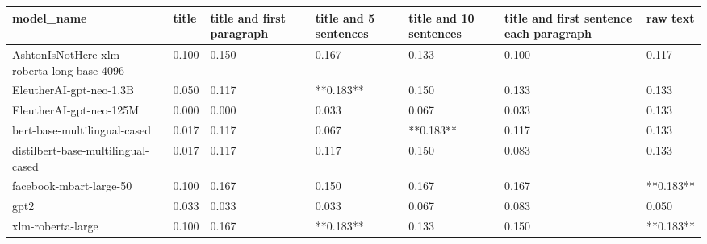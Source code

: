\begin{tabular}{lllllll}
\toprule
                                model\_name & title & title and first paragraph & title and 5 sentences & title and 10 sentences & title and first sentence each paragraph &  raw text \\
\midrule
AshtonIsNotHere-xlm-roberta-long-base-4096 & 0.100 &                     0.150 &                 0.167 &                  0.133 &                                   0.100 &     0.117 \\
                   EleutherAI-gpt-neo-1.3B & 0.050 &                     0.117 &             **0.183** &                  0.150 &                                   0.133 &     0.133 \\
                   EleutherAI-gpt-neo-125M & 0.000 &                     0.000 &                 0.033 &                  0.067 &                                   0.033 &     0.133 \\
              bert-base-multilingual-cased & 0.017 &                     0.117 &                 0.067 &              **0.183** &                                   0.117 &     0.133 \\
        distilbert-base-multilingual-cased & 0.017 &                     0.117 &                 0.117 &                  0.150 &                                   0.083 &     0.133 \\
                   facebook-mbart-large-50 & 0.100 &                     0.167 &                 0.150 &                  0.167 &                                   0.167 & **0.183** \\
                                      gpt2 & 0.033 &                     0.033 &                 0.033 &                  0.067 &                                   0.083 &     0.050 \\
                         xlm-roberta-large & 0.100 &                     0.167 &             **0.183** &                  0.133 &                                   0.150 & **0.183** \\
\bottomrule
\end{tabular}
